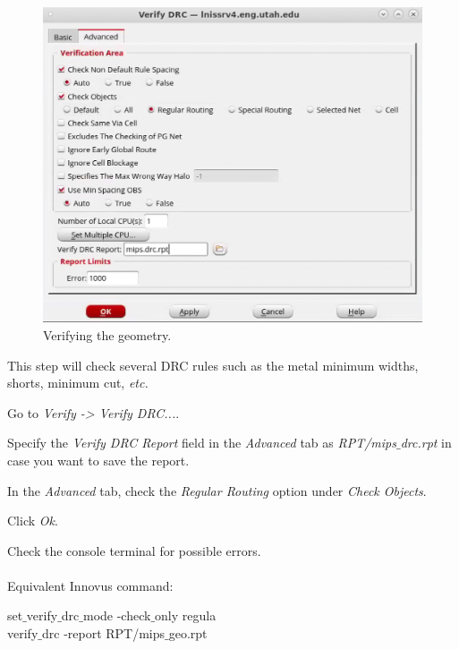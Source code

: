 \begin{enumerate}
	\parbox[t]{\dimexpr\textwidth-\leftmargin}{%
	\begin{figure}
		\vspace{-6mm}
		\centering
		\vspace{-\baselineskip}
		\includegraphics[scale=0.3]{figures/lab5_backend/verify_drc}
		\caption{Verifying the geometry.}
		\label{fillercells}
	\end{figure}
This step will check several DRC rules such as the metal minimum widths, shorts, minimum cut, \textit{etc.}
		\item Go to \textit{Verify -> Verify DRC...}.
		\item Specify the \textit{Verify DRC Report} field in the \textit{Advanced} tab as \textit{RPT/mips$\_$drc.rpt} in case you want to save the report.
		\item In the \textit{Advanced} tab, check the \textit{Regular Routing} option under \textit{Check Objects}.
		\item Click \textit{Ok}.
		\item Check the console terminal for possible errors. \\ \\
		Equivalent Innovus command:
		\begin{codeline}
		set$\_$verify$\_$drc$\_$mode -check$\_$only regula \\
verify$\_$drc ‐report RPT/mips$\_$geo.rpt

		\end{codeline}
		

} 
	\end{enumerate}


